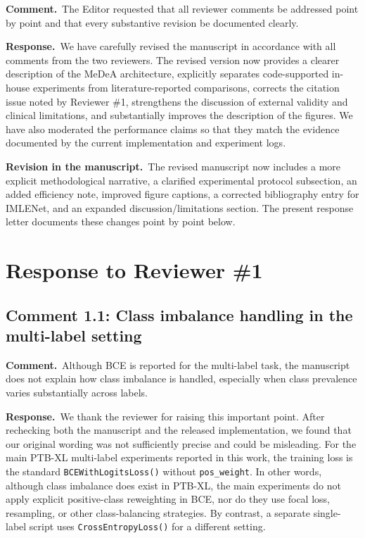 \documentclass[11pt]{article}
\newcommand{\commentheader}{\textbf{Comment.}}
\newcommand{\responseheader}{\textbf{Response.}}
\newcommand{\revisionheader}{\textbf{Revision in the manuscript.}}
\begin{document}
\commentheader\ The Editor requested that all reviewer comments be addressed point by point and that every substantive revision be documented clearly.

\responseheader\ We have carefully revised the manuscript in accordance with all comments from the two reviewers. The revised version now provides a clearer description of the MeDeA architecture, explicitly separates code-supported in-house experiments from literature-reported comparisons, corrects the citation issue noted by Reviewer \#1, strengthens the discussion of external validity and clinical limitations, and substantially improves the description of the figures. We have also moderated the performance claims so that they match the evidence documented by the current implementation and experiment logs.

\revisionheader\ The revised manuscript now includes a more explicit methodological narrative, a clarified experimental protocol subsection, an added efficiency note, improved figure captions, a corrected bibliography entry for IMLENet, and an expanded discussion/limitations section. The present response letter documents these changes point by point below.

\section*{Response to Reviewer \#1}

\subsection*{Comment 1.1: Class imbalance handling in the multi-label setting}

\commentheader\ Although BCE is reported for the multi-label task, the manuscript does not explain how class imbalance is handled, especially when class prevalence varies substantially across labels.

\responseheader\ We thank the reviewer for raising this important point. After rechecking both the manuscript and the released implementation, we found that our original wording was not sufficiently precise and could be misleading. For the main PTB-XL multi-label experiments reported in this work, the training loss is the standard \texttt{BCEWithLogitsLoss()} without \texttt{pos\_weight}. In other words, although class imbalance does exist in PTB-XL, the main experiments do not apply explicit positive-class reweighting in BCE, nor do they use focal loss, resampling, or other class-balancing strategies. By contrast, a separate single-label script uses \texttt{CrossEntropyLoss()} for a different setting.
\end{document}
